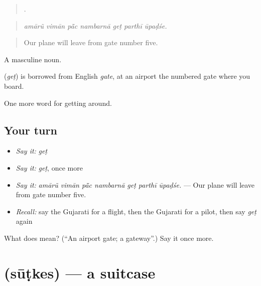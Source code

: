 \begin{quote}
      .
\end{quote}

\begin{quote}
\emph{amārũ vimān pā̃c nambarnā geṭ parthī ūpaḍśe.}
\end{quote}

\begin{quote}
Our plane will leave from gate number five.
\end{quote}

A masculine noun.

\begin{cousinweb}
\textbf{} (\emph{geṭ}) is borrowed from English \emph{gate}, at an airport the numbered gate where you board.
\end{cousinweb}

\begin{grammarlens}[title={What you've built}]
One more word for getting around.
\end{grammarlens}

\subsection*{Your turn}
\begin{itemize}
\raggedright
  \item \emph{Say it:} \emph{geṭ}
  \item \emph{Say it:} \emph{geṭ}, once more
  \item \emph{Say it:} \emph{amārũ vimān pā̃c nambarnā geṭ parthī ūpaḍśe.} — Our plane will leave from gate number five.
  \item \emph{Recall:} say the Gujarati for a flight, then the Gujarati for a pilot, then say \emph{geṭ} again
\end{itemize}

\begin{tcolorbox}[breakable,colback=teal!4,colframe=teal!35!black,title={Before you move on}]
What does  mean? (\textquotedblleft{}An airport gate; a gateway\textquotedblright{}.) Say it once more.
\end{tcolorbox}
\section[\texorpdfstring{\gu{સૂટકેસ} (sūṭkes)}{સૂટકેસ (sūṭkes)}]{ (sūṭkes) — a suitcase}

\label{lesson:GU-C405-sutkes}




